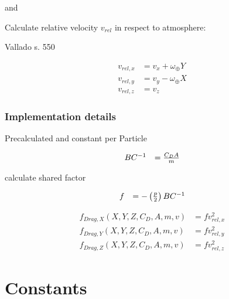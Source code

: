 \documentclass{article}
\begin{document}
and

Calculate relative velocity \(v_{rel}\) in respect to atmosphere:


Vallado s. 550

\begin{equation}
\begin{array}{ll}
v_{rel,x} &= v_x + \omega_{\oplus}Y \\
v_{rel,y} &= v_y - \omega_{\oplus}X \\
v_{rel,z} &= v_z
\end{array}
\end{equation}

\subsubsection{Implementation details}

Precalculated and constant per Particle

\begin{equation}
\begin{array}{ll}
BC^{-1} &={C_DA \over m}
\end{array}
\end{equation}

calculate shared factor

\begin{equation}
\begin{array}{ll}
f &= -\left(p \over 2\right)BC^{-1}
\end{array}
\end{equation}

\begin{equation}
\begin{array}{ll}
f_{Drag,X}(X,Y,Z,C_D,A,m,v) &= fv_{rel,x}^2 \\
f_{Drag,Y}(X,Y,Z,C_D,A,m,v) &= fv_{rel,y}^2 \\
f_{Drag,Z}(X,Y,Z,C_D,A,m,v) &= fv_{rel,z}^2
\end{array}
\end{equation}


\section{Constants}
\end{document}
